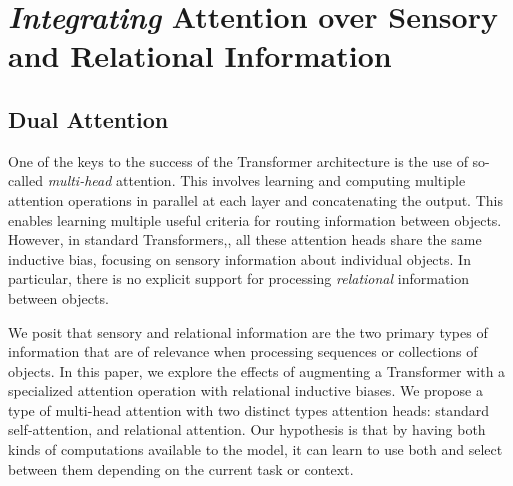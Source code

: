 \section{\textit{Integrating} Attention over Sensory and Relational Information}

\subsection{Dual Attention}

One of the keys to the success of the Transformer architecture is the use of so-called \textit{multi-head} attention. This involves learning and computing multiple attention operations in parallel at each layer and concatenating the output. This enables learning multiple useful criteria for routing information between objects. However, in standard Transformers,, all these attention heads share the same inductive bias, focusing on sensory information about individual objects. 
In particular, there is no explicit support for processing \textit{relational} information between objects.

We posit that sensory and relational information are the two primary types of information that are of relevance when processing sequences or collections of objects. 
In this paper, we explore the effects of augmenting a Transformer with a specialized attention operation with relational inductive biases. We propose a type of multi-head attention with two distinct types attention heads: standard self-attention, and relational attention. Our hypothesis is that by having both kinds of computations available to the model, it can learn to use both and select between them depending on the current task or context.

